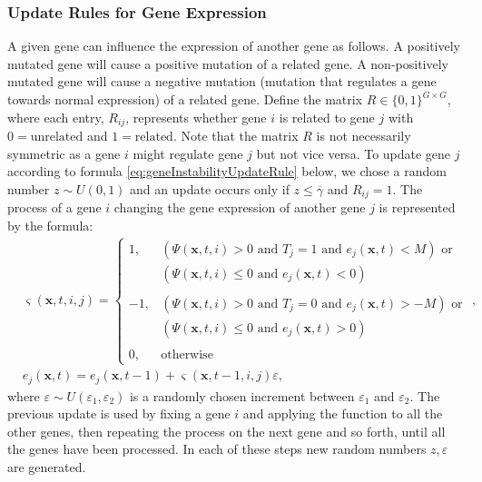 \documentclass[\main/thesis.tex]{subfiles}
\begin{document}
\subsubsection{Update Rules for Gene Expression}
A given gene can influence the expression of another gene as follows. 
A positively mutated gene will cause a positive mutation of a related gene. 
A non-positively mutated gene will cause a negative mutation (mutation that regulates a gene towards normal expression) of a related gene. 
Define the matrix $R {\in} \{ 0, 1 \}^{G{\times}G}$, where each entry, $R_{ij}$, 
represents whether gene $i$ is related to gene $j$ with $0{=}\text{unrelated}$ 
and $1{=}\text{related}$. Note that the matrix $R$ is not necessarily symmetric as a 
gene $i$ might regulate gene $j$ but not vice versa. To  update gene $j$ according to formula \eqref{eq:geneInstabilityUpdateRule} below, we chose a random number $z {\sim} U(0,1)$ and an update occurs only if $z {\leq} \overline{\gamma}$ and $R_{ij} {=} 1$.
The process of a gene $i$ changing the gene expression of another gene $j$ is 
represented by the formula:
\begin{align}
&\varsigma(\boldsymbol{x}, t, i, j) {=}
\begin{cases}
   1, &(\Psi(\boldsymbol{x}, t, i) {>} 0 \text{ and } T_j {=} 1 
       \text{ and } e_j(\boldsymbol{x}, t) {<} M) \text{ or }\\
      &(\Psi(\boldsymbol{x}, t, i) {\le} 0 \text{ and } e_j(\boldsymbol{x}, t) {<} 0)\\
  \\
  -1, &(\Psi(\boldsymbol{x}, t, i) {>} 0 \text{ and } T_j {=} 0 
       \text{ and } e_j(\boldsymbol{x}, t) {>} {-}M) \text{ or }\\
      &(\Psi(\boldsymbol{x}, t, i) {\le} 0 \text{ and } e_j(\boldsymbol{x}, t) {>} 0)\\
  \\
  0, &\text{otherwise}
\end{cases}, \label{eq:geneInstabilityUpdateFunction}\\
&e_j(\boldsymbol{x}, t) {=} e_j(\boldsymbol{x}, t{-}1) {+} \varsigma(\boldsymbol{x}, t{-}1, i, j) \varepsilon,
\label{eq:geneInstabilityUpdateRule}
\end{align}
where $\varepsilon {\sim} U(\varepsilon_1,\varepsilon_2)$ is a randomly chosen increment between $\varepsilon_1$ and $\varepsilon_2$.  The previous update is used by fixing a 
gene $i$ and applying the function to all the other genes, then repeating the process on the next gene and so forth, until all the genes have been processed. In each of these steps new random numbers $z,\varepsilon$ are generated. 
\end{document}
